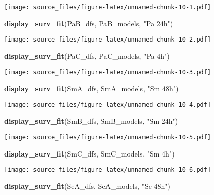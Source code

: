 \documentclass[]{article}
\newenvironment{Shaded}{\begin{snugshade}}{\end{snugshade}}
\newcommand{\KeywordTok}[1]{\textcolor[rgb]{0.13,0.29,0.53}{\textbf{#1}}}
\newcommand{\StringTok}[1]{\textcolor[rgb]{0.31,0.60,0.02}{#1}}
\newcommand{\NormalTok}[1]{#1}
\begin{document}
\texttt{[image: source\_files/figure-latex/unnamed-chunk-10-1.pdf]}

\begin{Shaded}
\begin{Highlighting}[]
\KeywordTok{display_surv_fit}\NormalTok{(PaB_dfs, PaB_models, }\StringTok{"Pa 24h"}\NormalTok{)}
\end{Highlighting}
\end{Shaded}

\texttt{[image: source\_files/figure-latex/unnamed-chunk-10-2.pdf]}

\begin{Shaded}
\begin{Highlighting}[]
\KeywordTok{display_surv_fit}\NormalTok{(PaC_dfs, PaC_models, }\StringTok{"Pa 4h"}\NormalTok{)}
\end{Highlighting}
\end{Shaded}

\texttt{[image: source\_files/figure-latex/unnamed-chunk-10-3.pdf]}

\begin{Shaded}
\begin{Highlighting}[]
\KeywordTok{display_surv_fit}\NormalTok{(SmA_dfs, SmA_models, }\StringTok{"Sm 48h"}\NormalTok{)}
\end{Highlighting}
\end{Shaded}

\texttt{[image: source\_files/figure-latex/unnamed-chunk-10-4.pdf]}

\begin{Shaded}
\begin{Highlighting}[]
\KeywordTok{display_surv_fit}\NormalTok{(SmB_dfs, SmB_models, }\StringTok{"Sm 24h"}\NormalTok{)}
\end{Highlighting}
\end{Shaded}

\texttt{[image: source\_files/figure-latex/unnamed-chunk-10-5.pdf]}

\begin{Shaded}
\begin{Highlighting}[]
\KeywordTok{display_surv_fit}\NormalTok{(SmC_dfs, SmC_models, }\StringTok{"Sm 4h"}\NormalTok{)}
\end{Highlighting}
\end{Shaded}

\texttt{[image: source\_files/figure-latex/unnamed-chunk-10-6.pdf]}

\begin{Shaded}
\begin{Highlighting}[]
\KeywordTok{display_surv_fit}\NormalTok{(SeA_dfs, SeA_models, }\StringTok{"Se 48h"}\NormalTok{)}
\end{Highlighting}
\end{Shaded}
\end{document}
